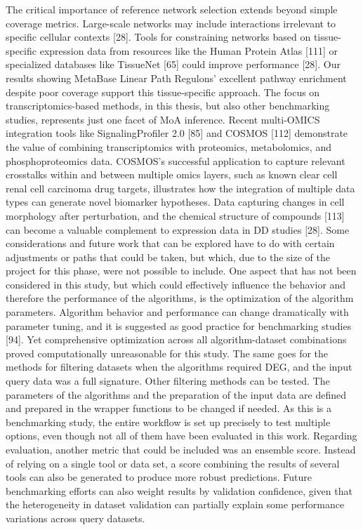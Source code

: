 The critical importance of reference network selection extends beyond simple coverage metrics. Large-scale networks may include interactions irrelevant to specific cellular contexts [28]. Tools for constraining networks based on tissue-specific expression data from resources like the Human Protein Atlas [111] or specialized databases like TissueNet [65] could improve performance [28]. Our results showing MetaBase Linear Path Regulons' excellent pathway enrichment despite poor coverage support this tissue-specific approach.
The focus on transcriptomics-based methods, in this thesis, but also other benchmarking studies, represents just one facet of MoA inference. Recent multi-OMICS integration tools like SignalingProfiler 2.0 [85] and COSMOS [112] demonstrate the value of combining transcriptomics with proteomics, metabolomics, and phosphoproteomics data. COSMOS's successful application to capture relevant crosstalks within and between multiple omics layers, such as known clear cell renal cell carcinoma drug targets, illustrates how the integration of multiple data types can generate novel biomarker hypotheses. Data capturing changes in cell morphology after perturbation, and the chemical structure of compounds [113] can become a valuable complement to expression data in DD studies [28]. 
Some considerations and future work that can be explored have to do with certain adjustments or paths that could be taken, but which, due to the size of the project for this phase, were not possible to include. One aspect that has not been considered in this study, but which could effectively influence the behavior and therefore the performance of the algorithms, is the optimization of the algorithm parameters. Algorithm behavior and performance can change dramatically with parameter tuning, and it is suggested as good practice for benchmarking studies [94]. Yet comprehensive optimization across all algorithm-dataset combinations proved computationally unreasonable for this study. The same goes for the methods for filtering datasets when the algorithms required DEG, and the input query data was a full signature. Other filtering methods can be tested. The parameters of the algorithms and the preparation of the input data are defined and prepared in the wrapper functions to be changed if needed. As this is a benchmarking study, the entire workflow is set up precisely to test multiple options, even though not all of them have been evaluated in this work. Regarding evaluation, another metric that could be included was an ensemble score. Instead of relying on a single tool or data set, a score combining the results of several tools can also be generated to produce more robust predictions. Future benchmarking efforts can also weight results by validation confidence, given that the heterogeneity in dataset validation can partially explain some performance variations across query datasets.
